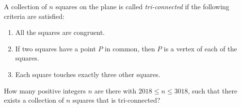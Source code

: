A collection of $n$ squares on the plane is called \emph{tri-connected} if the following criteria are satisfied:
\begin{enumerate}[label=(\roman*)]
	\item All the squares are congruent.
	\item If two squares have a point $P$ in common, then $P$ is a vertex of each of the squares.
	\item Each square touches exactly three other squares.
\end{enumerate}
How many positive integers $n$ are there with $2018\leq n \leq 3018$, such that there exists
a collection of $n$ squares that is tri-connected?